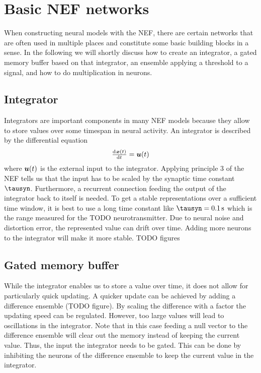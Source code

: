 \chapter{Basic NEF networks}
When constructing neural models with the NEF, there are certain networks that are often used in multiple places and constitute some basic building blocks in a sense.
In the following we will shortly discuss how to create an integrator, a gated memory buffer based on that integrator, an ensemble applying a threshold to a signal, and how to do multiplication in neurons.

\section{Integrator}
Integrators are important components in many NEF models because they allow to store values over some timespan in neural activity.
An integrator is described by the differential equation
\begin{equation}
    \od{\vc x(t)}{t} = \vc u(t)
\end{equation}
where $\bm{u}(t)$ is the external input to the integrator.
Applying principle 3 of the NEF tells us that the input has to be scaled by the synaptic time constant $\tausyn$.
Furthermore, a recurrent connection feeding the output of the integrator back to itself is needed.
To get a stable representations over a sufficient time window, it is best to use a long time constant like $\tausyn = \SI{0.1}{\second}$ which is the range measured for the TODO neurotransmitter.
Due to neural noise and distortion error, the represented value can drift over time.
Adding more neurons to the integrator will make it more stable.
TODO figures

\section{Gated memory buffer}
While the integrator enables us to store a value over time, it does not allow for particularly quick updating.
A quicker update can be achieved by adding a difference ensemble (TODO figure).
By scaling the difference with a factor the updating speed can be regulated.
However, too large values will lead to oscillations in the integrator.
Note that in this case feeding a null vector to the difference ensemble will clear out the memory instead of keeping the current value.
Thus, the input the integrator needs to be gated.
This can be done by inhibiting the neurons of the difference ensemble to keep the current value in the integrator.

